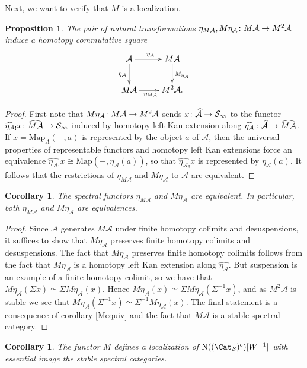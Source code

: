 \documentclass{amsart}
\renewcommand{\to}{\mathchoice{\longrightarrow}{\rightarrow}{\rightarrow}{\rightarrow}}
\let\catsymbfont\mathcal
\newcommand{\aA}{{\catsymbfont{A}}}
\newcommand{\aS}{{\catsymbfont{S}}}
\newcommand{\N}{\mathrm{N}}
\newcommand{\Map}{\mathrm{Map}}%
\newcommand{\ispec}{\aS_{\infty}}
\newcommand{\Spcat}{\Cat_\mathcal{S}}%
\numberwithin{equation}{section}
\newtheorem{corollary}[equation]{Corollary}
\newtheorem{proposition}[equation]{Proposition}
\theoremstyle{definition}
\begin{document}
Next, we want to verify that $M$ is a localization.

\begin{proposition}\label{commutes}
The pair of natural transformations $\eta_{M\aA},M\eta_{\aA}\colon
M\aA\to M^2\aA$ induce a homotopy commutative square
\[
\xymatrix{
\aA\ar[r]^{\eta_{\aA}}\ar[d]_{\eta_{\aA}} & M\aA\ar[d]^{M_{\eta_{\aA}}}\\
M\aA\ar[r]_{\eta_{M\aA}}            & M^2 \aA.}
\]
\end{proposition}

\begin{proof}
First note that $M\eta_{\aA}\colon M\aA\to M^2 \aA$ sends
$x\colon\widehat{\aA}\to\ispec$ to 
the functor $\widehat{\eta_{\aA}}_! x\colon\widehat{M\aA}\to\ispec$ induced by
homotopy left Kan extension along
$\widehat{\eta_{\aA}}:\widehat{\aA}\to\widehat{M\aA}$.
If $x=\Map_A(-,a)$ is represented by the object $a$ of $\aA$, then the
universal properties of representable functors and homotopy left Kan
extensions force an equivalence $\widehat{\eta_{\aA}}_!
x\cong\Map(-,\eta_{\aA}(a))$, so that $\widehat{\eta_{\aA}}_! x$ is
represented by $\eta_{\aA}(a)$.  It follows that the restrictions of
$\eta_{M{\aA}}$ and $M\eta_{\aA}$ to $\aA$ are equivalent.
\end{proof}

\begin{corollary}\label{etaM=Meta}
The spectral functors $\eta_{M\aA}$ and $M\eta_{\aA}$ are equivalent.
In particular, both $\eta_{M\aA}$ and $M\eta_{\aA}$ are equivalences.
\end{corollary}

\begin{proof}
Since $\aA$ generates $M\aA$ under finite homotopy colimits and
desuspensions, it suffices to show that $M\eta_{\aA}$ preserves finite
homotopy colimits and desuspensions.  The fact that $M\eta_{\aA}$
preserves finite homotopy colimits follows from the fact that
$M\eta_{\aA}$ is a homotopy left Kan extension along $\widehat{\eta_{\aA}}$.
But suspension is an example of a finite homotopy colimit, so we have
that $M\eta_{\aA}(\Sigma x)\simeq\Sigma M\eta_{\aA}(x)$.  Hence
$M\eta_{\aA}(x)\simeq\Sigma M\eta_{\aA}(\Sigma^{-1} x)$, and as $M^2 \aA$ is
stable we see that $M\eta_{\aA}(\Sigma^{-1} x)\simeq\Sigma^{-1}
M\eta_{\aA}(x)$.  The final statement is a consequence of corollary
\ref{Mequiv} and the fact that $M\aA$ is a stable spectral category.
\end{proof}

\begin{corollary}\label{local}
The functor $M$ defines a localization of $\N((\Spcat)^{\mathrm{c}})[W^{-1}]$
with essential image the stable spectral categories.
\end{corollary}
\end{document}
